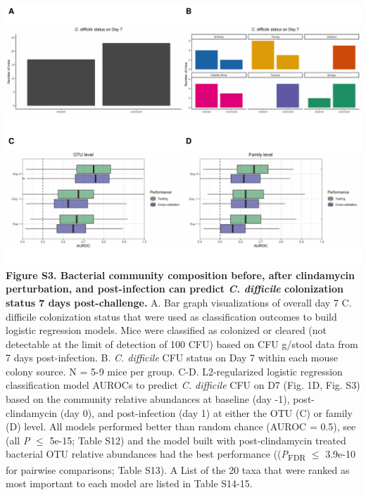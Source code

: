 \documentclass[11pt,]{article}
\begin{document}
\includegraphics{figure_S3.pdf} \textbf{Figure S3. Bacterial community
composition before, after clindamycin perturbation, and post-infection
can predict \emph{C. difficile} colonization status 7 days
post-challenge.} A. Bar graph visualizations of overall day 7 C.
difficile colonization status that were used as classification outcomes
to build logistic regression models. Mice were classified as colonized
or cleared (not detectable at the limit of detection of 100 CFU) based
on CFU g/stool data from 7 days post-infection. B. \emph{C. difficile}
CFU status on Day 7 within each mouse colony source. N = 5-9 mice per
group. C-D. L2-regularized logistic regression classification model
AUROCs to predict \emph{C. difficile} CFU on D7 (Fig. 1D, Fig. S3) based
on the community relative abundances at baseline (day -1),
post-clindamycin (day 0), and post-infection (day 1) at either the OTU
(C) or family (D) level. All models performed better than random chance
(AUROC = 0.5), see (all \emph{P} \(\le\) 5e-15; Table S12) and the model
built with post-clindamycin treated bacterial OTU relative abundances
had the best performance ((\emph{P}\textsubscript{FDR} \(\le\) 3.9e-10
for pairwise comparisons; Table S13). A List of the 20 taxa that were
ranked as most important to each model are listed in Table S14-15.

\newpage
\end{document}
